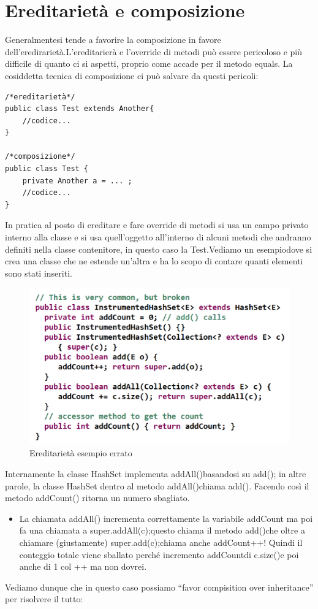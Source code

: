 \section{Ereditarietà e composizione}

Generalmentesi tende a favorire la composizione in favore dell’eredirarietà.L’ereditarierà e l’override di metodi può essere pericoloso e più difficile di quanto ci si aspetti, proprio come accade per il metodo equals. La cosiddetta tecnica di composizione ci può salvare da questi pericoli:

\begin{lstlisting}
/*ereditarietà*/
public class Test extends Another{
	//codice...
}

/*composizione*/
public class Test {
	private Another a = ... ;
	//codice...
}
\end{lstlisting}
In pratica al posto di ereditare e fare override di metodi si usa un campo privato interno alla classe e si usa quell’oggetto all’interno di alcuni metodi che andranno definiti nella classe contenitore, in questo caso la Test.Vediamo un esempiodove si crea una classe che ne estende un’altra e ha lo scopo di contare quanti elementi sono stati inseriti.

\begin{figure}[H]
\centering
\includegraphics[scale=0.8]{images/composizione}
\caption{Ereditarietà esempio errato\label{fig:UC3}}
\end{figure}
Internamente la classe HashSet implementa addAll()basandosi su add(); in altre parole, la classe HashSet dentro al metodo addAll()chiama add(). Facendo così il metodo addCount() ritorna un numero sbagliato.
\begin{itemize}
	\item La chiamata addAll() incrementa correttamente la variabile addCount ma poi fa una chiamata a super.addAll(c);questo chiama il metodo add()che oltre a chiamare (giustamente) super.add(c);chiama anche addCount++! Quindi il conteggio totale viene sballato perché incremento addCountdi c.size()e poi anche di 1 col ++ ma non dovrei.
	\end{itemize}
	Vediamo dunque che in questo caso possiamo “favor compisition over inheritance” per risolvere il tutto:

